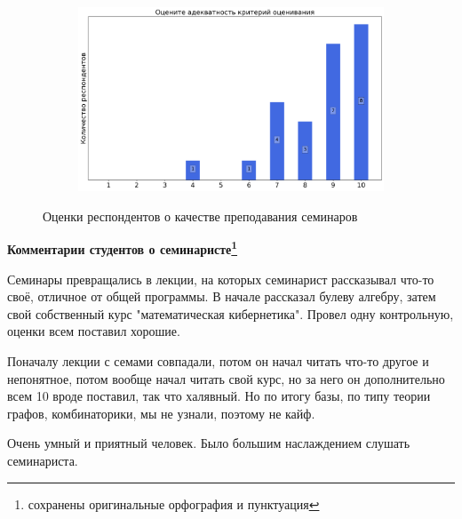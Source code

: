 \begin{figure}[H]
\begin{subfigure}[b]{0.45\textwidth}
			\end{subfigure}
			\begin{subfigure}[b]{0.45\textwidth}
				\centering
				\includegraphics[width=\textwidth]{images/1 course/Дискретный анализ/seminarists-marks-Бурцев А.А.-3.png}
			\end{subfigure}	
			\caption{Оценки респондентов о качестве преподавания семинаров}
		\end{figure}

		\textbf{Комментарии студентов о семинаристе\protect\footnote{сохранены оригинальные орфография и пунктуация}}
            \begin{commentbox} 
                Семинары превращались в лекции, на которых семинарист рассказывал что-то своё, отличное от общей программы. В начале рассказал булеву алгебру, затем свой собственный курс "математическая кибернетика". Провел одну контрольную, оценки всем поставил хорошие. 
            \end{commentbox} 
            
            \begin{commentbox} 
                Поначалу лекции с семами совпадали, потом он начал читать что-то другое и непонятное, потом вообще начал читать свой курс, но за него он дополнительно всем 10 вроде поставил, так что халявный. Но по итогу базы, по типу теории графов, комбинаторики, мы не узнали, поэтому не кайф. 
            \end{commentbox} 
            
            \begin{commentbox} 
                Очень умный и приятный человек. Было большим наслаждением слушать семинариста. 
            \end{commentbox} 
            
